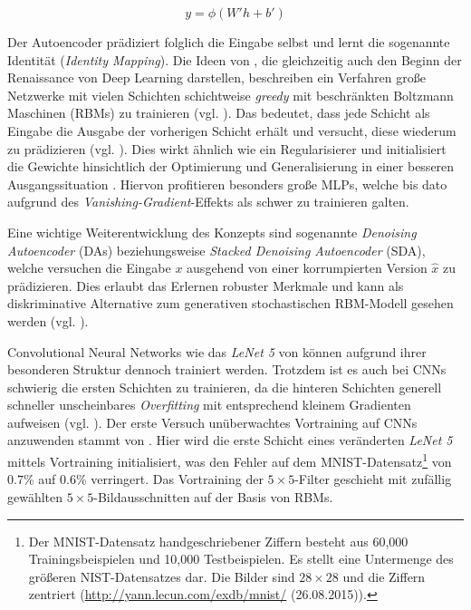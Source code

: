 \begin{equation}
\label{eq:autoenc2} 
y = \phi(W'h + b')
\end{equation}

Der Autoencoder prädiziert folglich die Eingabe selbst und lernt die sogenannte Identität (\textit{Identity Mapping}).
Die Ideen von \cite{Hinton2006}, die gleichzeitig auch den Beginn der Renaissance von Deep Learning darstellen, beschreiben ein Verfahren große Netzwerke mit vielen Schichten schichtweise \textit{greedy} mit beschränkten Boltzmann Maschinen (RBMs) zu trainieren (vgl. \cite{Bengio2007}). Das bedeutet, dass jede Schicht als Eingabe die Ausgabe der vorherigen Schicht erhält und versucht, diese wiederum zu prädizieren (vgl. \cite{Ranzato2006}). Dies wirkt ähnlich wie ein Regularisierer und initialisiert die Gewichte hinsichtlich der Optimierung und Generalisierung in einer besseren Ausgangssituation \cite[vgl.][]{Erhan2010}. Hiervon profitieren besonders große MLPs, welche bis dato aufgrund des \textit{Vanishing-Gradient}-Effekts als schwer zu trainieren galten. 

Eine wichtige Weiterentwicklung des Konzepts sind sogenannte \textit{Denoising Autoencoder} (DAs) beziehungsweise \textit{Stacked Denoising Autoencoder} (SDA), welche versuchen die Eingabe $ x $ ausgehend von einer korrumpierten Version $ \hat{x} $ zu prädizieren. Dies erlaubt das Erlernen robuster Merkmale und kann als diskriminative Alternative zum generativen stochastischen RBM-Modell gesehen werden (vgl. \cite{Vincent2008}). 

Convolutional Neural Networks wie das \textit{LeNet 5} von \cite{LeCun1998} können aufgrund ihrer besonderen Struktur dennoch trainiert werden. Trotzdem ist es auch bei CNNs schwierig die ersten Schichten zu trainieren, da die hinteren Schichten generell schneller unscheinbares \textit{Overfitting} mit entsprechend kleinem Gradienten aufweisen (vgl. \cite{Erhan2010}). Der erste Versuch un\-über\-wach\-tes Vortraining auf CNNs anzuwenden stammt von \cite{Ranzato2006}. Hier wird die erste Schicht eines veränderten \textit{LeNet 5} mittels Vortraining initialisiert, was den Fehler auf dem MNIST-Datensatz\footnote{Der MNIST-Datensatz handgeschriebener Ziffern besteht aus 60,000 Trainingsbeispielen und 10,000 Testbeispielen. Es stellt eine Untermenge des größeren NIST-Datensatzes dar. Die Bilder sind $28 \times 28$ und die Ziffern zentriert (\url{http://yann.lecun.com/exdb/mnist/} (26.08.2015)).} von $0.7 \%$ auf $0.6 \%$ verringert. Das Vortraining der $5 \times 5$-Filter geschieht mit zufällig gewählten $5 \times 5$-Bildausschnitten auf der Basis von RBMs.


